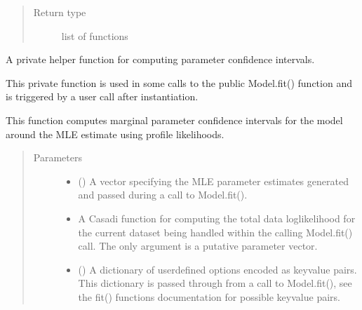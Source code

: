 \documentclass[letterpaper,10pt,english,openany,oneside]{sphinxmanual}
\begin{document}
\begin{fulllineitems}
\begin{fulllineitems}
\begin{quote}
\begin{description}
\begin{description}
\end{description}


\item[{Return type}] \leavevmode
list of functions

\end{description}\end{quote}

\end{fulllineitems}


\begin{fulllineitems}
\label{\detokenize{nloed:nloed.model.Model.__confidence_intervals}}
A private helper function for computing parameter confidence intervals.

This private function is used in some calls to the public Model.fit() function and is
triggered by a user call after instantiation.

This function computes marginal parameter confidence intervals for the model
around the MLE estimate using profile likelihoods.
\begin{quote}\begin{description}
\item[{Parameters}] \leavevmode\begin{itemize}
\item {} 
 (\sphinxstyleliteralemphasis{\sphinxupquote{, }}) \textendash{} A vector specifying the MLE parameter estimates generated and
passed during a call to Model.fit().

\item {} 
 \textendash{} A Casadi function for computing the total data log\sphinxhyphen{}likelihood for the
current dataset being handled within the calling Model.fit() call. The only argument
is a putative parameter vector.

\item {} 
 () \textendash{} A dictionary of user\sphinxhyphen{}defined options encoded as key\sphinxhyphen{}value
pairs. This dictionary is passed through from a call to Model.fit(), see
the fit() functions documentation for possible key\sphinxhyphen{}value pairs.


\end{itemize}
\end{description}
\end{quote}
\end{fulllineitems}
\end{fulllineitems}
\end{document}
